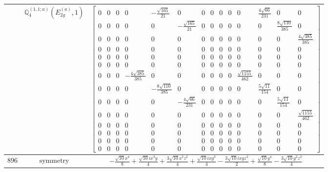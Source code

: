 \documentclass[fleqn,8pt,landscape]{jsarticle}
\begin{document}
\begin{longtable}{ccc}
$  $ & $ \mathbb{Q}_{4}^{(1,1;a)}(E_{2g}^{(a)},1) $ & $ \begin{bmatrix} 0 & 0 & 0 & 0 & - \frac{\sqrt{165}}{21} & 0 & 0 & 0 & 0 & 0 & 0 & \frac{4 \sqrt{66}}{231} & 0 & 0 \\ 0 & 0 & 0 & 0 & 0 & - \frac{\sqrt{165}}{21} & 0 & 0 & 0 & 0 & 0 & 0 & \frac{8 \sqrt{110}}{385} & 0 \\ 0 & 0 & 0 & 0 & 0 & 0 & 0 & 0 & 0 & 0 & 0 & 0 & 0 & \frac{4 \sqrt{385}}{385} \\ 0 & 0 & 0 & 0 & 0 & 0 & 0 & 0 & 0 & 0 & 0 & 0 & 0 & 0 \\ 0 & 0 & 0 & 0 & 0 & 0 & 0 & 0 & 0 & 0 & 0 & 0 & 0 & 0 \\ 0 & 0 & 0 & 0 & 0 & 0 & 0 & 0 & 0 & 0 & 0 & 0 & 0 & 0 \\ 0 & 0 & 0 & - \frac{4 \sqrt{385}}{385} & 0 & 0 & 0 & 0 & 0 & 0 & \frac{\sqrt{1155}}{462} & 0 & 0 & 0 \\ 0 & 0 & 0 & 0 & - \frac{8 \sqrt{110}}{385} & 0 & 0 & 0 & 0 & 0 & 0 & \frac{5 \sqrt{11}}{154} & 0 & 0 \\ 0 & 0 & 0 & 0 & 0 & - \frac{4 \sqrt{66}}{231} & 0 & 0 & 0 & 0 & 0 & 0 & \frac{5 \sqrt{11}}{154} & 0 \\ 0 & 0 & 0 & 0 & 0 & 0 & 0 & 0 & 0 & 0 & 0 & 0 & 0 & \frac{\sqrt{1155}}{462} \\ 0 & 0 & 0 & 0 & 0 & 0 & 0 & 0 & 0 & 0 & 0 & 0 & 0 & 0 \\ 0 & 0 & 0 & 0 & 0 & 0 & 0 & 0 & 0 & 0 & 0 & 0 & 0 & 0 \\ 0 & 0 & 0 & 0 & 0 & 0 & 0 & 0 & 0 & 0 & 0 & 0 & 0 & 0 \\ 0 & 0 & 0 & 0 & 0 & 0 & 0 & 0 & 0 & 0 & 0 & 0 & 0 & 0 \end{bmatrix} $ \\ \hline
$ 896 $ & $ \text{symmetry} $ & $ - \frac{\sqrt{10} x^{4}}{8} + \frac{\sqrt{10} i x^{3} y}{4} + \frac{3 \sqrt{10} x^{2} z^{2}}{4} + \frac{\sqrt{10} i x y^{3}}{4} - \frac{3 \sqrt{10} i x y z^{2}}{2} + \frac{\sqrt{10} y^{4}}{8} - \frac{3 \sqrt{10} y^{2} z^{2}}{4} $ \\

\end{longtable}
\end{document}

